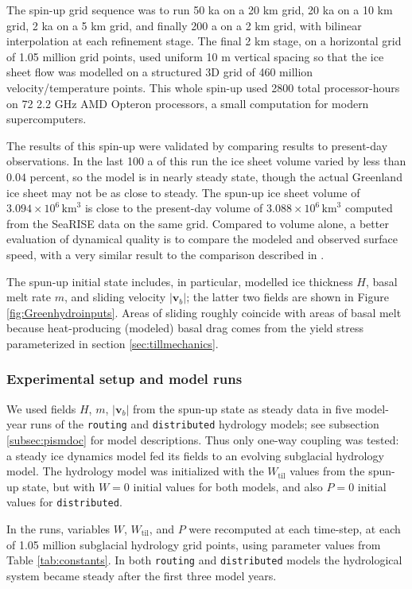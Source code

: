 \documentclass[gmd]{copernicus}   %
\begin{document}
The spin-up grid sequence was to run 50 ka on a 20 km grid, 20 ka on a 10 km grid, 2 ka on a 5 km grid, and finally 200 a on a 2 km grid, with bilinear interpolation at each refinement stage.  The final 2 km stage, on a horizontal grid of 1.05 million grid points, used uniform 10 m vertical spacing so that the ice sheet flow was modelled on a structured 3D grid of 460 million velocity/temperature points.  This whole spin-up used 2800 total processor-hours on 72 2.2 GHz AMD Opteron processors, a small computation for modern supercomputers.

The results of this spin-up were validated by comparing results to present-day observations.  In the last 100 a of this run the ice sheet volume varied by less than $0.04$ percent, so the model is in nearly steady state, though the actual Greenland ice sheet may not be as close to steady.  The spun-up ice sheet volume of $3.094\times 10^{6}\,\textrm{km}^3$ is close to the present-day volume of $3.088\times 10^{6}\,\textrm{km}^3$ computed from the SeaRISE data on the same grid.  Compared to volume alone, a better evaluation of dynamical quality is to compare the modeled and observed \citep{Joughinetal2010} surface speed, with a very similar result to the comparison described in \cite{AschwandenAdalgeirsdottirKhroulev}.

The spun-up initial state includes, in particular, modelled ice thickness $H$, basal melt rate $m$, and sliding velocity $|\mathbf{v}_b|$; the latter two fields are shown in Figure \ref{fig:Greenhydroinputs}.  Areas of sliding roughly coincide with areas of basal melt because heat-producing (modeled) basal drag comes from the yield stress parameterized in section \ref{sec:tillmechanics}.

\subsubsection{Experimental setup and model runs}  We used fields $H$, $m$, $|\mathbf{v}_b|$ from the spun-up state as steady data in five model-year runs of the \texttt{routing} and \texttt{distributed}  hydrology models; see subsection \ref{subsec:pismdoc} for model descriptions.  Thus only one-way coupling was tested: a steady ice dynamics model fed its fields to an evolving subglacial hydrology model.  The hydrology model was initialized with the $W_{\text{til}}$ values from the spun-up state, but with $W=0$ initial values for both models, and also $P=0$ initial values for \texttt{distributed}.

In the runs, variables $W$, $W_{\text{til}}$, and $P$ were recomputed at each time-step, at each of 1.05 million subglacial hydrology grid points, using parameter values from Table \ref{tab:constants}.  In both \texttt{routing} and \texttt{distributed} models the hydrological system became steady after the first three model years.
\end{document}
